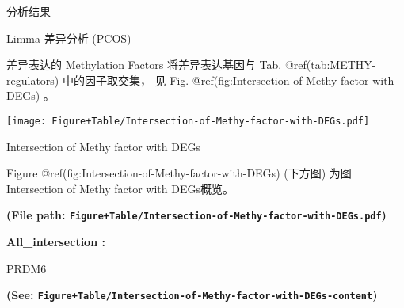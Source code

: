 \documentclass[
  ignorenonframetext,
]{beamer}
\begin{document}
\begin{frame}[fragile]{分析结果}
\begin{block}{Limma 差异分析 (PCOS)}
\begin{center}\vspace{1.5cm}\end{center}
\end{block}

\begin{block}{差异表达的 Methylation Factors}
\protect\hypertarget{ux5deeux5f02ux8868ux8fbeux7684-methylation-factors}{}
将差异表达基因与 Tab. @ref(tab:METHY-regulators) 中的因子取交集， 见
Fig. @ref(fig:Intersection-of-Methy-factor-with-DEGs) 。

\begin{center}\vspace{1.5cm}\end{center}
\def\@captype{figure}
\begin{center}
\texttt{[image: Figure+Table/Intersection-of-Methy-factor-with-DEGs.pdf]}
\caption{Intersection of Methy factor with DEGs}\label{fig:Intersection-of-Methy-factor-with-DEGs}
\end{center}

Figure @ref(fig:Intersection-of-Methy-factor-with-DEGs) (下方图)
为图Intersection of Methy factor with DEGs概览。

\textbf{(File path:
\texttt{Figure+Table/Intersection-of-Methy-factor-with-DEGs.pdf})}

\begin{center}\vspace{1.5cm}\end{center}\begin{center}\begin{tcolorbox}[colback=gray!10, colframe=gray!50, width=0.9\linewidth, arc=1mm, boxrule=0.5pt]
\textbf{
All\_intersection
:}

\vspace{0.5em}

    PRDM6

\vspace{2em}
\end{tcolorbox}
\end{center}

\textbf{(See:
\texttt{Figure+Table/Intersection-of-Methy-factor-with-DEGs-content})}

\begin{center}\vspace{1.5cm}\end{center}


\end{block}
\end{frame}
\end{document}
